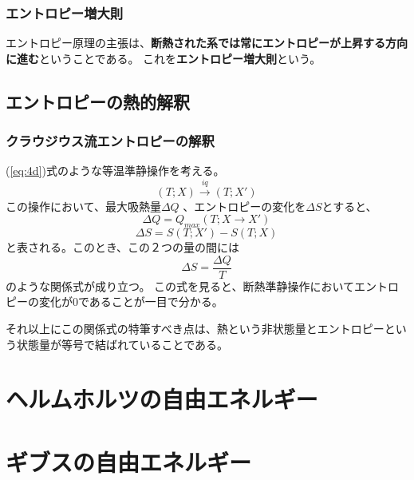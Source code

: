 \documentclass[a4paper]{jsreport}
\begin{document}
            \subsection*{エントロピー増大則}
                エントロピー原理の主張は、\textbf{断熱された系では常にエントロピーが上昇する方向に進む}ということである。
                これを\textbf{エントロピー増大則}という。
        \section{エントロピーの熱的解釈}
            \subsection*{クラウジウス流エントロピーの解釈}
                (\ref{eq:4d})式のような等温準静操作を考える。
                \begin{equation} \label{eq:4d}
                    (T; X) \xrightarrow{iq} (T; X')
                \end{equation}
                この操作において、最大吸熱量$\Delta Q$ 、エントロピーの変化を$\Delta S$とすると、
                \begin{equation}
                    \Delta Q = Q_{max}(T; X \xrightarrow{} X')
                \end{equation}
                \begin{equation}
                    \Delta S = S(T; X') - S(T; X)
                \end{equation}
                と表される。このとき、この２つの量の間には
                \begin{equation}
                    \Delta S = \frac{\Delta Q}{T}
                \end{equation}
                のような関係式が成り立つ。
                この式を見ると、断熱準静操作においてエントロピーの変化が$0$であることが一目で分かる。\par
                それ以上にこの関係式の特筆すべき点は、熱という非状態量とエントロピーという状態量が等号で結ばれていることである。

    
    \chapter{ヘルムホルツの自由エネルギー}
    
    
    \chapter{ギブスの自由エネルギー}
        
\end{document}

